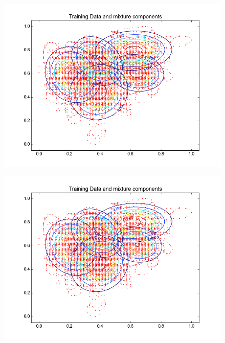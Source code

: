 \documentclass[11pt,a4paper]{article}
\begin{document}
\begin{minipage}[b]{0.25\textwidth}
\begin{figure}[H]
  \centering
  \includegraphics[width=.8\linewidth]{Figures/contours_LA.test10.png}

  \label{fig:sfig1}
\end{figure}%
\end{minipage}
\begin{minipage}[b]{0.25\textwidth}
\begin{figure}[H]
  \centering
  \includegraphics[width=.8\linewidth]{Figures/contours_LA.test15.png}

  \label{fig:sfig1}
\end{figure}%
\end{minipage}
\end{document}
